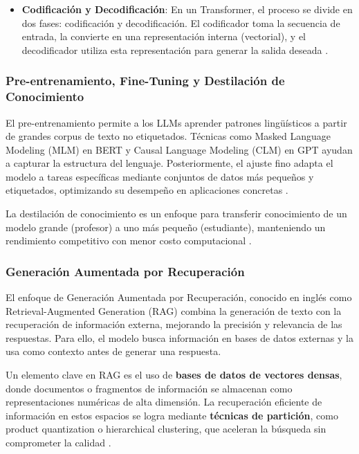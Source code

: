 \documentclass[../main.tex]{subfiles}
\begin{document}
\begin{itemize}
    \item \textbf{Codificación y Decodificación}:
En un Transformer, el proceso se divide en dos fases: codificación y decodificación. El codificador toma la secuencia de entrada, la convierte en una representación interna (vectorial), y el decodificador utiliza esta representación para generar la salida deseada \parencite{vaswani2017attention}.

 
\end{itemize}

\subsubsection{Pre-entrenamiento, Fine-Tuning y Destilación de Conocimiento}  
El pre-entrenamiento permite a los LLMs aprender patrones lingüísticos a partir de grandes corpus de texto no etiquetados. Técnicas como Masked Language Modeling (MLM) en BERT y Causal Language Modeling (CLM) en GPT ayudan a capturar la estructura del lenguaje. Posteriormente, el ajuste fino adapta el modelo a tareas específicas mediante conjuntos de datos más pequeños y etiquetados, optimizando su desempeño en aplicaciones concretas \parencite{ren2024learning}.

La destilación de conocimiento es un enfoque para transferir conocimiento de un modelo grande (profesor) a uno más pequeño (estudiante), manteniendo un rendimiento competitivo con menor costo computacional \parencite{sreenivasllm}.


\subsubsection{Generación Aumentada por Recuperación}  
El enfoque de Generación Aumentada por Recuperación, conocido en inglés como Retrieval-Augmented Generation (RAG) combina la generación de texto con la recuperación de información externa, mejorando la precisión y relevancia de las respuestas. Para ello, el modelo busca información en bases de datos externas y la usa como contexto antes de generar una respuesta.  

Un elemento clave en RAG es el uso de \textbf{bases de datos de vectores densas}, donde documentos o fragmentos de información se almacenan como representaciones numéricas de alta dimensión. La recuperación eficiente de información en estos espacios se logra mediante \textbf{técnicas de partición}, como product quantization o hierarchical clustering, que aceleran la búsqueda sin comprometer la calidad \parencite{lewis2020retrieval}.
\end{document}

